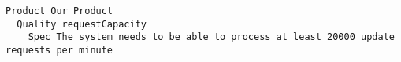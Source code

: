 \begin{lstlisting}
Product Our Product
  Quality requestCapacity
    Spec The system needs to be able to process at least 20000 update requests per minute

\end{lstlisting}